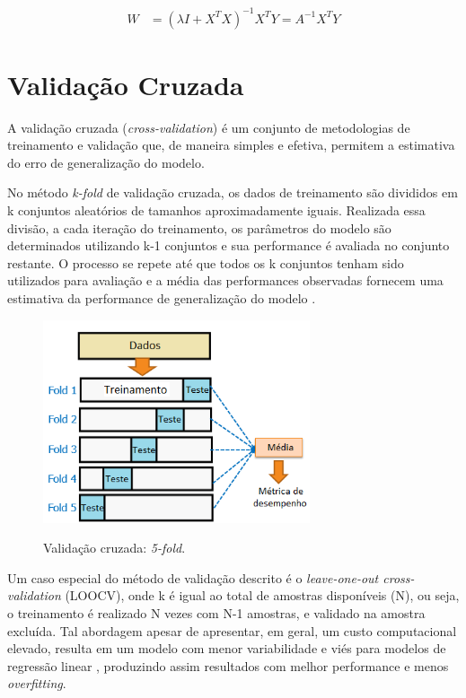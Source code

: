 \begin{equation}\begin{split}
    W &= (\lambda I + X^TX)^{-1}X^TY = A^{-1}X^TY
    \label{eq:lsnormal_reg}
\end{split}\end{equation}


\section{Validação Cruzada}

A validação cruzada (\textit{cross-validation}) é um conjunto de metodologias de treinamento e validação que, de maneira simples e efetiva, permitem a estimativa do erro de generalização do modelo.

No método \textit{k-fold} de validação cruzada, os dados de treinamento são divididos em k conjuntos aleatórios de tamanhos aproximadamente iguais. Realizada essa divisão, a cada iteração do treinamento, os parâmetros do modelo são determinados utilizando k-1 conjuntos e sua performance é avaliada no conjunto restante. O processo se repete até que todos os k conjuntos tenham sido utilizados para avaliação e a média das performances observadas fornecem uma estimativa da performance de generalização do modelo \cite{overfitting_crossval}.

\begin{figure}[H]
    \centering
    \caption{Validação cruzada: \textit{5-fold}.}
    \includegraphics[width=0.7\textwidth]{imgs/rev/cross_validation}
    \label{fig:dim_perf}
\end{figure}

Um caso especial do método de validação descrito é o \textit{leave-one-out cross-validation} (LOOCV), onde k é igual ao total de amostras disponíveis (N), ou seja, o treinamento é realizado N vezes com N-1 amostras, e validado na amostra excluída. Tal abordagem apesar de apresentar, em geral, um custo computacional elevado, resulta em um modelo com menor variabilidade e viés para modelos de regressão linear \cite{burman}, produzindo assim resultados com melhor performance e menos \textit{overfitting}.

